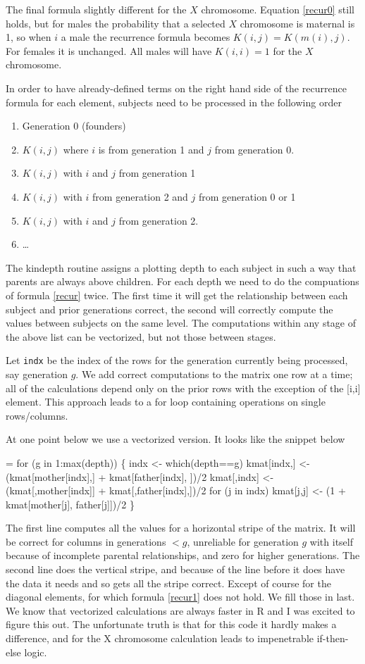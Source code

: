 \documentclass{article}
\begin{document}
The final formula slightly different for the $X$ chromosome. 
Equation \ref{recur0} still holds, but for males the probability
that a selected $X$ chromosome is maternal is 1, so when $i$ a male
the recurrence formula becomes $K(i,j) = K(m(i),j)$.  
For females it is unchanged.
All males will have $K(i,i) = 1$ for the $X$ chromosome.

In order to have already-defined terms on the right hand side of the
recurrence formula for each element, subjects need to be processed
in the following order
\begin{enumerate}
  \item Generation 0 (founders)
  \item $K(i,j)$ where $i$ is from generation 1 and $j$ from generation 0.
  \item $K(i,j)$ with $i$ and $j$ from generation 1
  \item $K(i,j)$ with $i$ from generation 2 and $j$ from generation 0 or 1
  \item $K(i,j)$ with $i$ and $j$ from generation 2.
  \item \ldots
\end{enumerate}
The kindepth routine assigns a plotting depth to each subject in such
a way that parents are always above children.  
For each depth we need to do the compuations of formula \eqref{recur}
twice.  The first time it will get the relationship between each subject
and prior generations correct, the second will correctly compute the
values between subjects on the same level.
The computations within any stage of the above list can be vectorized,
but not those between stages.

Let \Verb!indx! be the index of the
rows for the generation currently being processed, say generation $g$.  
We add correct computations to the matrix one row at a time;
all of the calculations depend only on the prior rows with the
exception of the [i,i] element.
This approach leads to
a for loop containing operations on single rows/columns.  

At one point below we use a vectorized version. It looks like the snippet below
\begin{nwchunk}
=
 for (g in 1:max(depth)) \{
     indx <- which(depth==g)
     kmat[indx,] <- (kmat[mother[indx],] + kmat[father[indx], ])/2
     kmat[,indx] <- (kmat[,mother[indx]] + kmat[,father[indx],])/2
     for (j in indx) kmat[j,j] <- (1 + kmat[mother[j], father[j]])/2
 \}
\end{nwchunk}
The first line computes all the values for a horizontal stripe of the
matrix. It will be correct for columns in generations $<g$, unreliable
for generation $g$ with itself because of incomplete parental relationships,
and zero for higher generations.
The second line does the vertical stripe, and because of the line before it
does have the data it needs and so gets all the stripe correct.
Except of course for the diagonal elements, for which formula \eqref{recur1}
does not hold.  We fill those in last.
We know that vectorized calculations are always faster in R and I was excited
to figure this out.  The unfortunate truth is that for this code
it hardly makes a difference, and for the X chromosome calculation leads to
impenetrable if-then-else logic.
\end{document}
